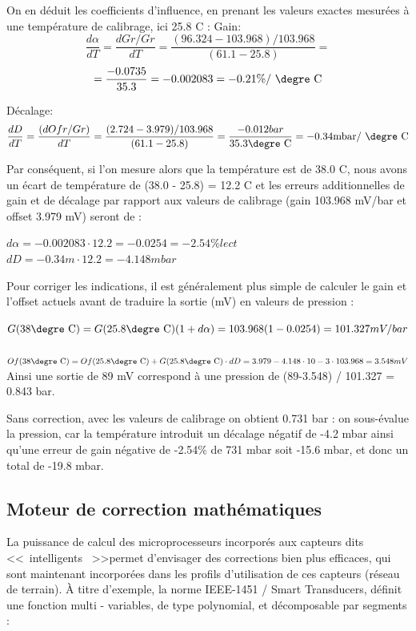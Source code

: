 On en déduit les coefficients d'influence, en prenant les valeurs exactes mesurées à une température de calibrage, ici 25.8 \degre C :
Gain:
\[
\frac{d\alpha}{dT} = \frac{dGr/Gr}{dT} = \frac{(96.324-103.968)/103.968}{ (61.1-25.8)} =\]
\begin{equation}
= \frac{-0.0735}{35.3} = -0.002083 = -0.21 \% \text{/ \degre C}
\end{equation}

Décalage:
\begin{equation}
\frac{dD}{dT} = \frac{(dOfr/Gr)}{dT} = \frac{(2.724-3.979)/103.968}{(61.1-25.8)} =
 \frac{-0.012 bar}{ 35.3 \text{\degre C}} = -0.34 \text{mbar/ \degre C}
\end{equation}

Par conséquent, si l'on mesure alors que la température est de 38.0 \degre C, nous avons un écart de température de (38.0 - 25.8) = 12.2 \degre C et les erreurs additionnelles de gain et de décalage par rapport aux valeurs de calibrage (gain 103.968 mV/bar et offset 3.979 mV) seront de :

$d\alpha = -0.002083 \cdot 12.2 = -0.0254 = -2.54 \% lect $
\\
$dD = -0.34 m \cdot 12.2 = - 4.148 mbar $

Pour corriger les indications, il est généralement plus simple de calculer le gain et l'offset actuels avant de traduire la sortie (mV) en valeurs de pression :

$G(38 \text{\degre C}) = G(25.8 \text{\degre C}) (1 + d \alpha) = 103.968(1-0.0254) = 101.327 mV/bar $
\\
\\
$Of(38 \text{\degre C}) = Of(25.8 \text{\degre C}) + G(25.8 \text{\degre C}) \cdot dD = 3.979 - 4.148 \cdot 10-3 \cdot 103.968 = 3.548 mV$
\\

Ainsi une sortie de 89 mV correspond à une pression de (89-3.548) / 101.327 = 0.843 bar.

Sans correction, avec les valeurs de calibrage on obtient 0.731 bar : on sous-évalue la pression, car la température introduit un décalage négatif de -4.2 mbar ainsi qu'une erreur de gain négative de -2.54\% de 731 mbar soit -15.6 mbar, et donc un total de -19.8 mbar.

\subsection{Moteur de correction mathématiques}

La puissance de calcul des microprocesseurs incorporés aux capteurs dits \textless\textless\ intelligents \ \textgreater\textgreater permet d'envisager des corrections bien plus efficaces, qui sont maintenant incorporées dans les profils d'utilisation de ces capteurs (réseau de terrain).
À titre d'exemple, la norme IEEE-1451 / Smart Transducers, définit une fonction multi - variables, de type polynomial, et décomposable par segments :

